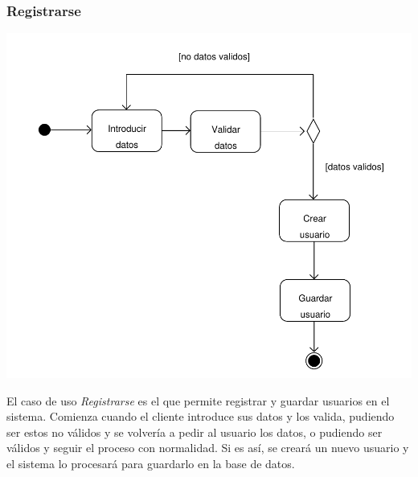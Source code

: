 \documentclass[11pt, a4paper, twoside, titlepage]{article}
\begin{document}
			\subsubsection{Registrarse}
				\begin{center}
					\includegraphics[scale=.8]{analisis/diagramas/da_registrarse.pdf}
				\end{center}
				
				El caso de uso {\itshape Registrarse} es el que permite registrar y guardar usuarios en el sistema. 
				Comienza cuando el cliente introduce sus datos y los valida, pudiendo ser estos no válidos y se volvería a pedir al usuario los datos, o pudiendo ser válidos y seguir el proceso con normalidad. Si es así, se creará un nuevo usuario y el sistema lo procesará para guardarlo en la base de datos.
\end{document}
